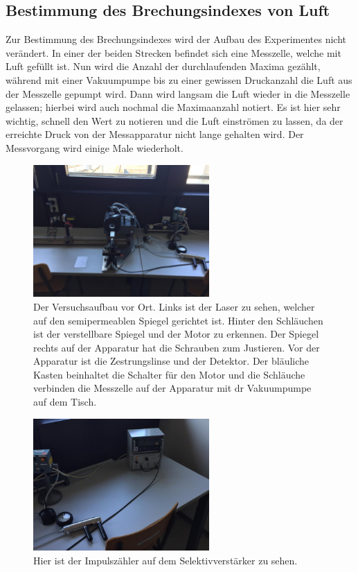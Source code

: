 \subsection{Bestimmung des Brechungsindexes von Luft}
Zur Bestimmung des Brechungsindexes wird der Aufbau des Experimentes nicht verändert. In einer der beiden Strecken befindet sich eine Messzelle, welche mit Luft gefüllt ist.
Nun wird die Anzahl der durchlaufenden Maxima gezählt, während mit einer Vakuumpumpe bis zu einer gewissen Druckanzahl die Luft aus der Messzelle gepumpt wird.
Dann wird langsam die Luft wieder in die Messzelle gelassen; hierbei wird auch nochmal die Maximaanzahl notiert. Es ist hier sehr wichtig, schnell den Wert zu notieren und die Luft einströmen zu lassen, 
da der erreichte Druck von der Messapparatur nicht lange gehalten wird. Der Messvorgang wird einige Male wiederholt.

\begin{figure}
    \centering
    \includegraphics[width=0.6\textwidth]{content/aufbaufoto1.jpeg}
    \caption{Der Versuchsaufbau vor Ort. Links ist der Laser zu sehen, welcher auf den semipermeablen Spiegel gerichtet ist. Hinter den Schläuchen ist der verstellbare
    Spiegel und der Motor zu erkennen. Der Spiegel rechts auf der Apparatur hat die Schrauben zum Justieren. Vor der Apparatur ist die Zestrungslinse und der Detektor.
    Der bläuliche Kasten beinhaltet die Schalter für den Motor und die Schläuche verbinden die Messzelle auf der Apparatur mit dr Vakuumpumpe auf dem Tisch.}
\end{figure}

\begin{figure}
    \centering
    \includegraphics[width=0.6\textwidth]{content/aufbaufoto2.jpeg}
    \caption{Hier ist der Impulszähler auf dem Selektivverstärker zu sehen.}
\end{figure}